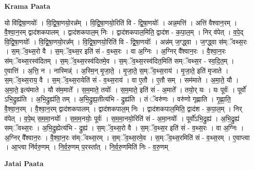\documentclass[17pt]{extarticle}
\begin{document}
\textbf{Krama Paata} \newline

यो वि॑द्विषा॒णयोः᳚ । वि॒द्वि॒षा॒णयो॒रन्न᳚म् । वि॒द्वि॒षा॒णयो॒रिति॑ वि - द्वि॒षा॒णयोः᳚ । अन्न॒मत्ति॑ । अत्ति॑ वैश्वान॒रम् । वै॒श्वा॒न॒रम् द्वाद॑शकपालम् । द्वाद॑शकपाल॒म् निः । द्वाद॑शकपाल॒मिति॒ द्वाद॑श - क॒पा॒ल॒म् । निर् व॑पेत् । व॒पे॒द् वि॒द्वि॒षा॒णयोः᳚ । वि॒द्वि॒षा॒णयो॒रन्न᳚म् । वि॒द्वि॒षा॒णयो॒रिति॑ वि - द्वि॒षा॒णयोः᳚ । अन्न॑म् ज॒ग्द्ध्वा । ज॒ग्द्ध्वा स॑म्ॅवथ्स॒रः । स॒म्ॅव॒थ्स॒रो वै । स॒म्ॅव॒थ्स॒र इति॑ सं - व॒थ्स॒रः । वा अ॒ग्निः । अ॒ग्निर् वै᳚श्वान॒रः । वै॒श्वा॒न॒रः स॑म्ॅवथ्स॒रस्व॑दितम् । स॒म्ॅव॒थ्स॒रस्व॑दितमे॒व । स॒म्ॅव॒थ्स॒रस्व॑दित॒मिति॑ सम्ॅवथ्स॒र - स्व॒दि॒त॒म् । ए॒वात्ति॑ । अ॒त्ति॒ न । नास्मिन्न्॑ । अ॒स्मि॒न् मृ॒जा॒ते॒ । मृ॒जा॒ते॒ स॒म्ॅव॒थ्स॒राय॑ । मृ॒जा॒ते॒ इति॑ मृजाते । स॒म्ॅव॒थ्स॒राय॒ वै । स॒म्ॅव॒थ्स॒रायेति॑ सं - व॒थ्स॒राय॑ । वा ए॒तौ । ए॒तौ सम् । सम॑माते । अ॒मा॒ते॒ यौ । अ॒मा॒ते॒ इत्य॑माते । यौ स॑म॒माते᳚ । स॒म॒माते॒ तयोः᳚ । स॒म॒माते॒ इति॑ सं - अ॒माते᳚ । तयो॒र् यः । यः पूर्वः॑ । पूर्वो॑ ऽभि॒द्रुह्य॑ति । अ॒भि॒द्रुह्य॑ति॒ तम् । अ॒भि॒द्रुह्य॒तीत्य॑भि - द्रुह्य॑ति । तं ॅवरु॑णः । वरु॑णो गृह्णाति । गृ॒ह्णा॒ति॒ वै॒श्वा॒न॒रम् । वै॒श्वा॒न॒रम् द्वाद॑शकपालम् । द्वाद॑शकपाल॒म् निः । द्वाद॑शकपाल॒मिति॒ द्वाद॑श - क॒पा॒ल॒म् । निर् व॑पेत् । व॒पे॒थ् स॒म॒मा॒नयोः᳚ । स॒म॒म॒नयोः॒ पूर्वः॑ । स॒म॒मा॒नयो॒रिति॑ सं - अ॒मा॒नयोः᳚ । पूर्वो॑ऽभि॒द्रुह्य॑ । अ॒भि॒द्रुह्य॑ सम्ॅवथ्स॒रः । अ॒भि॒द्रुह्येत्य॑भि - द्रुह्य॑ । स॒म्ॅव॒थ्स॒रो वै । स॒म्ॅव॒थ्स॒र इति॑ सं - व॒थ्स॒रः । वा अ॒ग्निः । अ॒ग्निर् वै᳚श्वान॒रः । वै॒श्वा॒न॒रः स॑म्ॅवथ्स॒रम् । स॒म्ॅव॒थ्स॒रमे॒व । स॒म्ॅव॒थ्स॒रमिति॑ सं - व॒थ्स॒रम् । ए॒वाप्त्वा । आ॒प्त्वा नि॑र्वरु॒णम् । नि॒र्व॒रु॒णम् प॒रस्ता᳚त् । नि॒र्व॒रु॒णमिति॑ निः - व॒रु॒णम् \newline

\textbf{Jatai Paata} \newline
\end{document}

